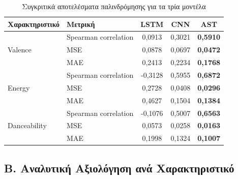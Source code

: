 \documentclass[a4paper,12pt]{article}
\begin{document}
\begin{table}[H]
    \centering
    \begin{tabular}{llccc}
    \toprule
    \textbf{Χαρακτηριστικό} & \textbf{Μετρική} & \textbf{LSTM} & \textbf{CNN} & \textbf{AST} \\
    \midrule
    \multirow{3}{*}{Valence} 
    & Spearman correlation & 0,0913 & 0,3021 & \textbf{0,5910} \\
    & MSE & 0,0878 & 0,0697 & \textbf{0,0472} \\
    & MAE & 0,2413 & 0,2234 & \textbf{0,1768} \\
    \midrule
    \multirow{3}{*}{Energy}
    & Spearman correlation & -0,3128 & 0,5955 & \textbf{0,6872} \\
    & MSE & 0,2728 & 0,0408 & \textbf{0,0296} \\
    & MAE & 0,4627 & 0,1504 & \textbf{0,1384} \\
    \midrule
    \multirow{3}{*}{Danceability}
    & Spearman correlation & -0,1076 & 0,5007 & \textbf{0,6563} \\
    & MSE & 0,0573 & 0,0258 & \textbf{0,0163} \\
    & MAE & 0,1998 & 0,1324 & \textbf{0,1007} \\
    \bottomrule
    \end{tabular}
    \caption{Συγκριτικά αποτελέσματα παλινδρόμησης για τα τρία μοντέλα}
\end{table}

\subsection*{B. Αναλυτική Αξιολόγηση ανά Χαρακτηριστικό}
\end{document}
